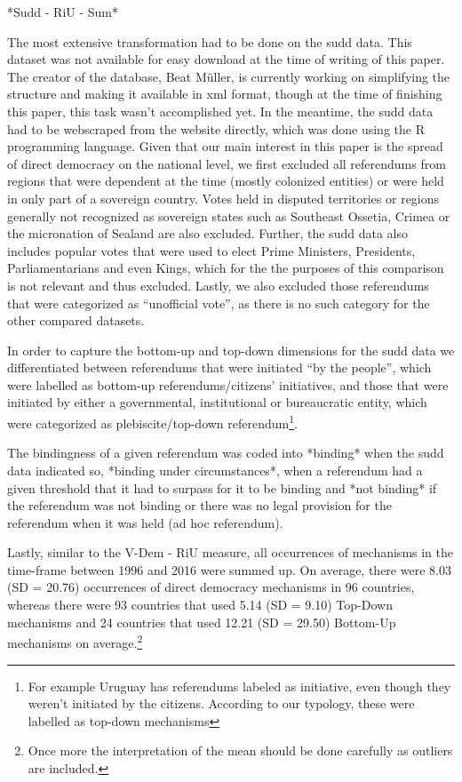 \documentclass{systats}
\begin{document}
*Sudd - RiU - Sum*

The most extensive transformation had to be done on the sudd data. This dataset was not available for easy download at the time of writing of this paper. The creator of the database, Beat Müller, is currently working on simplifying the structure and making it available in xml format, though at the time of finishing this paper, this task wasn’t accomplished yet. In the meantime, the sudd data had to be webscraped from the website directly, which was done using the R programming language. Given that our main interest in this paper is the spread of direct democracy on the national level, we first excluded all referendums from regions that were dependent at the time (mostly colonized entities) or were held in only part of a sovereign country. Votes held in disputed territories or regions generally not recognized as sovereign states such as Southeast Ossetia, Crimea or the micronation of Sealand are also excluded. Further, the sudd data also includes popular votes that were used to elect Prime Ministers, Presidents, Parliamentarians and even Kings, which for the the purposes of this comparison is not relevant and thus excluded. Lastly, we also excluded those referendums that were categorized as “unofficial vote”, as there is no such category for the other compared datasets.

In order to capture the bottom-up and top-down dimensions for the sudd data we differentiated between referendums that were initiated “by the people”, which were labelled as bottom-up referendums/citizens’ initiatives, and those that were initiated  by either a governmental, institutional or bureaucratic entity, which were categorized as plebiscite/top-down referendum\footnote{For example Uruguay has referendums labeled as initiative, even though they weren't initiated by the citizens. According to our typology, these were labelled as top-down mechanisms}.

The bindingness of a given referendum was coded into *binding* when the sudd data indicated so, *binding under circumstances*, when a referendum had a given threshold that it had to surpass for it to be binding and *not binding* if the referendum was not binding or there was no legal provision for the referendum when it was held (ad hoc referendum).

Lastly, similar to the V-Dem - RiU measure, all occurrences of mechanisms in the time-frame between 1996 and 2016 were summed up. On average, there were 8.03 (SD = 20.76) occurrences of  direct democracy mechanisms in 96 countries, whereas there were 93 countries that used 5.14 (SD = 9.10) Top-Down mechanisms and 24 countries that used 12.21 (SD = 29.50) Bottom-Up mechanisms on average.\footnote{Once more the interpretation of the mean should be done carefully as outliers are included.}
\end{document}
